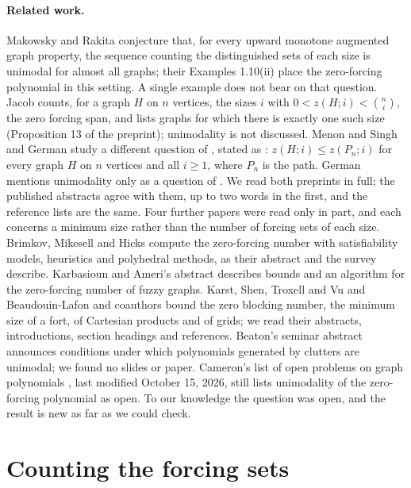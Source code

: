 \documentclass[11pt]{article}
\begin{document}
\paragraph{Related work.}
Makowsky and Rakita \cite[Conjecture 1]{makowsky} conjecture that, for
every upward monotone augmented graph property, the sequence counting the
distinguished sets of each size is unimodal for almost all graphs; their
Examples 1.10(ii) place the zero-forcing polynomial in this setting. A
single example does not bear on that question. Jacob \cite{jacob} counts, for a graph $H$ on $n$ vertices, the
sizes $i$ with $0<z(H;i)<\binom{n}{i}$, the zero forcing span, and lists
graphs for which there is exactly one such size (Proposition 13 of the
preprint); unimodality is not discussed. Menon and Singh
\cite{menon} and German \cite{german} study a different question of
\cite{boyer}, stated as \cite[Conjecture 1.1]{menon}:
$z(H;i)\leq z(P_n;i)$ for every graph $H$ on $n$ vertices and all
$i\geq1$, where $P_n$ is the path. German mentions unimodality only as a
question of \cite{boyer}. We read both preprints in full; the published
abstracts agree with them, up to two words in the first, and the
reference lists are the same. Four further papers were read only in part,
and each concerns a minimum size rather than the number of forcing sets
of each size. Brimkov, Mikesell and Hicks \cite{brimkov} compute the
zero-forcing number with satisfiability models, heuristics and polyhedral
methods, as their abstract and the survey \cite{notices} describe.
Karbasioun and Ameri's abstract \cite{fuzzy} describes bounds and an
algorithm for the zero-forcing number of fuzzy graphs. Karst, Shen,
Troxell and Vu \cite{karst} and Beaudouin-Lafon and coauthors
\cite{grids} bound the zero blocking number, the minimum size of a fort,
of Cartesian products and of grids; we read their abstracts,
introductions, section headings and references. Beaton's seminar abstract
\cite{beaton} announces conditions under which polynomials generated by
clutters are unimodal; we found no slides or paper. Cameron's list of open
problems on graph polynomials \cite{cameron}, last modified October 15,
2026, still lists unimodality of the zero-forcing polynomial as open. To
our knowledge the question was open, and the result is new as far as we
could check.

\section{Counting the forcing sets}
\end{document}
